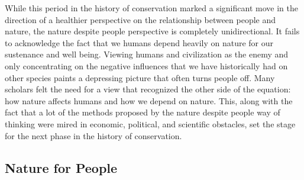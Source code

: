 \documentclass[rutwik_proposal.tex]{subfiles}
\begin{document}
While this period in the history of conservation marked a significant move in the direction of a healthier perspective on the relationship between people and nature, the nature despite people perspective is completely unidirectional. It fails to acknowledge the fact that we humans depend heavily on nature for our sustenance and well being. Viewing humans and civilization as the enemy and only concentrating on the negative influences that we have historically had on other species paints a depressing picture that often turns people off. Many scholars felt the need for a view that recognized the other side of the equation: how nature affects humans and how we depend on nature. This, along with the fact that a lot of the methods proposed by the nature despite people way of thinking were mired in economic, political, and scientific obstacles, set the stage for the next phase in the history of conservation.

\subsection{Nature for People}\label{ecoservices}
\end{document}
